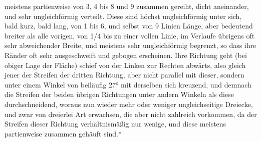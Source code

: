 \documentclass[a4paper, 11pt, oneside, german]{article}
\begin{document}
meistens partienweise von 3, 4 bis 8 und 9 zusammen gereiht, dicht aneinander, und sehr ungleichförmig verteilt. Diese sind höchst ungleichförmig unter sich, bald kurz, bald lang, von 1 bis 6, und selbst von 9 Linien Länge, aber bedeutend breiter als alle vorigen, von 1/4 bis zu einer vollen Linie, im Verlaufe übrigens oft sehr abweichender Breite, und meistens sehr ungleichförmig begrenzt, so dass ihre Ränder oft sehr ausgeschweift und gebogen erscheinen. Ihre Richtung geht (bei obiger Lage der Fläche) schief von der Linken zur Rechten abwärts, also gleich jener der Streifen der dritten Richtung, aber nicht parallel mit dieser, sondern unter einem Winkel von beiläufig 27° mit derselben sich kreuzend, und demnach die Streifen der beiden übrigen Richtungen unter andern Winkeln als diese durchschneidend, woraus nun wieder mehr oder weniger ungleichseitige Dreiecke, und zwar von dreierlei Art erwachsen, die aber nicht zahlreich vorkommen, da der Streifen dieser Richtung verhältnismäßig nur wenige, und diese meistens partienweise zusammen gehäuft sind.*
\end{document}
